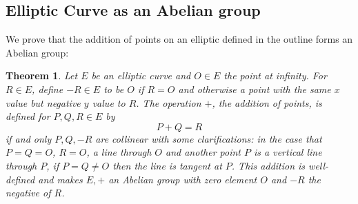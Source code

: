 \documentclass{article}
\newtheorem{thm}{Theorem}[section]
\theoremstyle{definition}
\theoremstyle{definition}
\theoremstyle{definition}
\begin{document}
\subsection{Elliptic Curve as an Abelian group}

We prove that the addition of points on an elliptic defined in the outline forms an Abelian group:

\begin{thm} Let $E$ be an elliptic curve and $O\in E$ the point at infinity. For $R\in E$, define $-R\in E$ to be $O$ if $R=O$ and otherwise a point with the same $x$ value but negative $y$ value to $R$. The operation $+$, the addition of points, is defined for $P,Q,R\in E$ by
$$P+Q=R$$
if and only $P, Q, -R$ are collinear with some clarifications: in the case that $P=Q=O$, $R=O$, a line through $O$ and another point $P$ is a vertical line through $P$, if $P=Q\neq O$ then the line is tangent at $P$. This addition is well-defined and makes $E,+$ an Abelian group with zero element $O$ and $-R$ the negative of $R$.

\end{thm}
\end{document}

